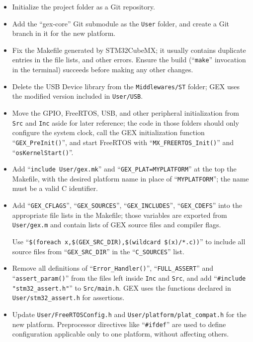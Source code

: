 \begin{itemize}	
	\item Initialize the project folder as a Git repository.
	
	\item Add the ``gex-core'' Git submodule as the \verb|User| folder, and create a Git branch in it for the new platform.
	
	\item Fix the Makefile generated by STM32CubeMX; it usually contains duplicate entries in the file lists, and other errors. Ensure the build (``\verb|make|'' invocation in the terminal) succeeds before making any other changes.
	
	\item Delete the USB Device library from the \verb|Middlewares/ST| folder; GEX uses the modified version included in \verb|User/USB|.
	
	\item Move the \gls{GPIO}, FreeRTOS, USB, and other peripheral initialization from \verb|Src| and \verb|Inc| aside for later reference; the code in those folders should only configure the system clock, call the GEX initialization function ``\verb|GEX_PreInit()|'', and start FreeRTOS with ``\verb|MX_FREERTOS_Init()|'' and ``\verb|osKernelStart()|''.
	
	\item Add ``\verb|include User/gex.mk|'' and ``\verb|GEX_PLAT=MYPLATFORM|'' at the top the Makefile, with the desired platform name in place of ``\verb|MYPLATFORM|''; the name must be a valid C identifier.
	
	\item Add ``\verb|GEX_CFLAGS|'', ``\verb|GEX_SOURCES|'', ``\verb|GEX_INCLUDES|'', ``\verb|GEX_CDEFS|'' into the appropriate file lists in the Makefile; those variables are exported from \verb|User/gex.m| and contain lists of GEX source files and compiler flags.
	
	Use ``\verb|$(foreach x,$(GEX_SRC_DIR),$(wildcard $(x)/*.c))|'' to include all source files from ``\verb|GEX_SRC_DIR|'' in the ``\verb|C_SOURCES|'' list.
	
	\item Remove all definitions of ``\verb|Error_Handler()|'', ``\verb|FULL_ASSERT|'' and ``\verb|assert_param()|'' from the files left inside \verb|Inc| and \verb|Src|, and add ``\verb|#include "stm32_assert.h"|'' to \verb|Src/main.h|. GEX uses the functions declared in \verb|User/stm32_assert.h| for assertions.
	
	\item Update \verb|User/FreeRTOSConfig.h| and \verb|User/platform/plat_compat.h| for the new platform. Preprocessor directives like ``\verb|#ifdef|'' are used to define configuration applicable only to one platform, without affecting others.
	

\end{itemize}
